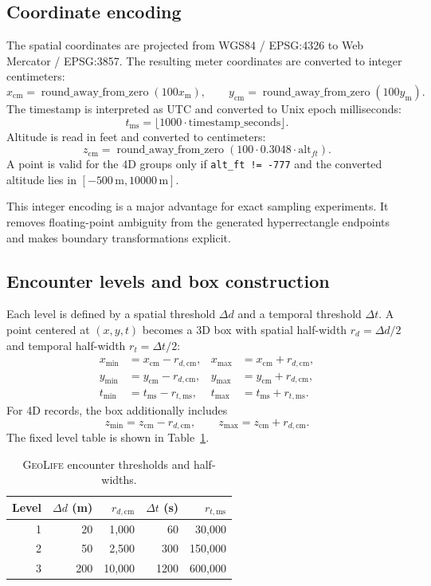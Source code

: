 \documentclass[11pt]{article}
\newcommand{\code}[1]{\ifmmode\text{\ttfamily #1}\else\texttt{#1}\fi}
\newcommand{\geolife}{\textsc{GeoLife}}
\newcommand{\ms}{\mathrm{ms}}
\newcommand{\cm}{\mathrm{cm}}
\newcommand{\meters}{\mathrm{m}}
\begin{document}
\subsection{Coordinate encoding}

The spatial coordinates are projected from WGS84 / EPSG:4326 to Web Mercator / EPSG:3857.  The resulting meter coordinates are converted to integer centimeters:
\[
  x_{\cm} = \operatorname{round\_away\_from\_zero}(100x_{\meters}),
  \qquad
  y_{\cm} = \operatorname{round\_away\_from\_zero}(100y_{\meters}).
\]
The timestamp is interpreted as UTC and converted to Unix epoch milliseconds:
\[
  t_{\ms}=\lfloor 1000\cdot \mathrm{timestamp\_seconds}\rfloor.
\]
Altitude is read in feet and converted to centimeters:
\[
  z_{\cm}=\operatorname{round\_away\_from\_zero}(100\cdot 0.3048\cdot \mathrm{alt}_{ft}).
\]
A point is valid for the 4D groups only if \code{alt\_ft != -777} and the converted altitude lies in $[-500\,\meters,10000\,\meters]$.

This integer encoding is a major advantage for exact sampling experiments.  It removes floating-point ambiguity from the generated hyperrectangle endpoints and makes boundary transformations explicit.

\subsection{Encounter levels and box construction}

Each level is defined by a spatial threshold $\Delta d$ and a temporal threshold $\Delta t$.  A point centered at $(x,y,t)$ becomes a 3D box with spatial half-width $r_d=\Delta d/2$ and temporal half-width $r_t=\Delta t/2$:
\[
\begin{aligned}
  x_{\min} &= x_{\cm}-r_{d,\cm}, & x_{\max} &= x_{\cm}+r_{d,\cm},\\
  y_{\min} &= y_{\cm}-r_{d,\cm}, & y_{\max} &= y_{\cm}+r_{d,\cm},\\
  t_{\min} &= t_{\ms}-r_{t,\ms}, & t_{\max} &= t_{\ms}+r_{t,\ms}.
\end{aligned}
\]
For 4D records, the box additionally includes
\[
  z_{\min}=z_{\cm}-r_{d,\cm},
  \qquad
  z_{\max}=z_{\cm}+r_{d,\cm}.
\]
The fixed level table is shown in Table~\ref{tab:geolife-levels}.

\begin{table}[t]
\centering
\small
\begin{tabular}{rrrrr}
\toprule
Level & $\Delta d$ (m) & $r_{d,\cm}$ & $\Delta t$ (s) & $r_{t,\ms}$ \\
\midrule
1 &  20 &  1,000 &   60 &   30,000 \\
2 &  50 &  2,500 &  300 &  150,000 \\
3 & 200 & 10,000 & 1200 &  600,000 \\
\bottomrule
\end{tabular}
\caption{\geolife{} encounter thresholds and half-widths.}
\label{tab:geolife-levels}
\end{table}
\end{document}
